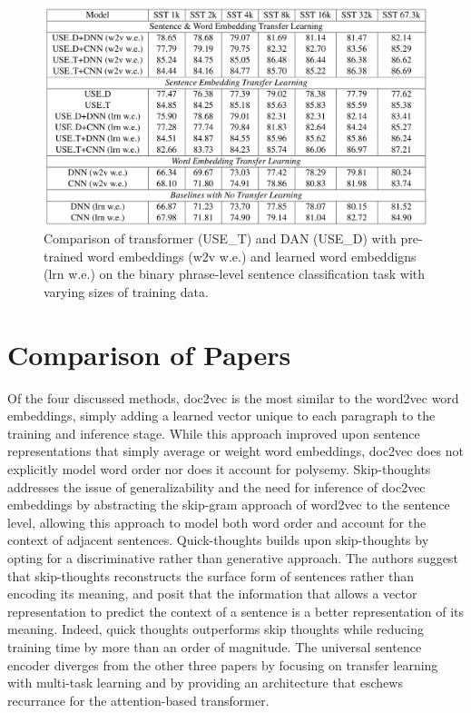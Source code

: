 \begin{figure}[h!]
\centering
  \includegraphics[width=1\linewidth]{files/use-3.png}
  \caption{Comparison of transformer (USE\_T) and DAN (USE\_D) with pre-trained word embeddings (w2v w.e.) and learned word embeddigns (lrn w.e.) on the binary phrase-level sentence classification task with varying sizes of training data.}
  \label{fig:use-2}
\end{figure}

\newpage

\section{\label{sec:level5} Comparison of Papers}

Of the four discussed methods, doc2vec \cite{conf/icml/LeM14} is the most similar to the word2vec word embeddings, simply adding a learned vector unique to each paragraph to the training and inference stage. While this approach improved upon sentence representations that simply average or weight word embeddings, doc2vec does not explicitly model word order nor does it account for polysemy. Skip-thoughts \cite{DBLP:journals/corr/KirosZSZTUF15} addresses the issue of generalizability and the need for inference of doc2vec embeddings by abstracting the skip-gram approach of word2vec to the sentence level, allowing this approach to model both word order and account for the context of adjacent sentences. Quick-thoughts \cite{logeswaran2018an} builds upon skip-thoughts by opting for a discriminative rather than generative approach. The authors suggest that skip-thoughts reconstructs the surface form of sentences rather than encoding its meaning, and posit that the information that allows a vector representation to predict the context of a sentence is a better representation of its meaning. Indeed, quick thoughts outperforms skip thoughts while reducing training time by more than an order of magnitude. The universal sentence encoder \cite{use} diverges from the other three papers by focusing on transfer learning with multi-task learning and by providing an architecture that eschews recurrance for the attention-based transformer. 

